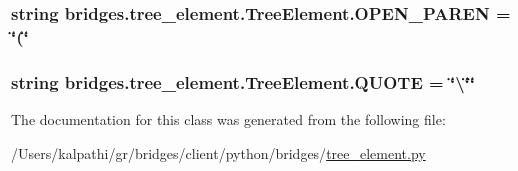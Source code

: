 \subsubsection[{O\+P\+E\+N\+\_\+\+P\+A\+R\+E\+N}]{\setlength{\rightskip}{0pt plus 5cm}string bridges.\+tree\+\_\+element.\+Tree\+Element.\+O\+P\+E\+N\+\_\+\+P\+A\+R\+E\+N = \char`\"{}(\char`\"{}\hspace{0.3cm}{\ttfamily [static]}}\label{classbridges_1_1tree__element_1_1_tree_element_a09d8d27767e40f3b84a8395123cfa15a}
\hypertarget{classbridges_1_1tree__element_1_1_tree_element_aa5a4d14f38ceb896a85ef0b703d6995a}{}
\subsubsection[{Q\+U\+O\+T\+E}]{\setlength{\rightskip}{0pt plus 5cm}string bridges.\+tree\+\_\+element.\+Tree\+Element.\+Q\+U\+O\+T\+E = \char`\"{}\textbackslash{}\char`\"{}\char`\"{}\hspace{0.3cm}{\ttfamily [static]}}\label{classbridges_1_1tree__element_1_1_tree_element_aa5a4d14f38ceb896a85ef0b703d6995a}


The documentation for this class was generated from the following file\+:\begin{DoxyCompactItemize}
\item 
/\+Users/kalpathi/gr/bridges/client/python/bridges/\hyperlink{tree__element_8py}{tree\+\_\+element.\+py}\end{DoxyCompactItemize}
